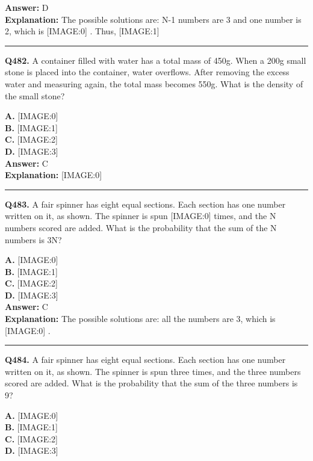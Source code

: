 \documentclass[12pt]{article}
\begin{document}
\textbf{Answer:} D \\
\textbf{Explanation:} The possible solutions are: N-1 numbers are 3 and one number is 2, which is
[IMAGE:0]
.
Thus,
[IMAGE:1]

\hrule
\vspace{1em}


\noindent
\textbf{Q482.} A container filled with water has a total mass of 450g. When a 200g small stone is placed into the container, water overflows. After removing the excess water and measuring again, the total mass becomes 550g. What is the density of the small stone?



\textbf{A.} [IMAGE:0] \\
\textbf{B.} [IMAGE:1] \\
\textbf{C.} [IMAGE:2] \\
\textbf{D.} [IMAGE:3] \\

\textbf{Answer:} C \\
\textbf{Explanation:} [IMAGE:0]

\hrule
\vspace{1em}


\noindent
\textbf{Q483.} A fair spinner has eight equal sections. Each section has one number written on it, as shown.
The spinner is spun
[IMAGE:0]
times, and the N numbers scored are added. What is the probability that the sum of the N numbers is 3N?



\textbf{A.} [IMAGE:0] \\
\textbf{B.} [IMAGE:1] \\
\textbf{C.} [IMAGE:2] \\
\textbf{D.} [IMAGE:3] \\

\textbf{Answer:} C \\
\textbf{Explanation:} The possible solutions are: all the numbers are 3, which is
[IMAGE:0]
.

\hrule
\vspace{1em}


\noindent
\textbf{Q484.} A
fair spinner has eight equal sections. Each section has one number written on it, as shown.
The spinner is spun three times, and the three numbers scored are added. What is the probability that the sum of the three numbers is 9?



\textbf{A.} [IMAGE:0] \\
\textbf{B.} [IMAGE:1] \\
\textbf{C.} [IMAGE:2] \\
\textbf{D.} [IMAGE:3] \\
\end{document}
